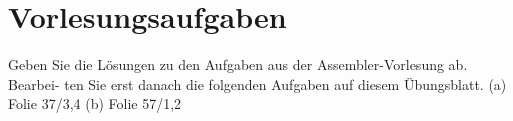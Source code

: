 \documentclass{lehramt-informatik-aufgabe}
\begin{document}
\section{Vorlesungsaufgaben}

Geben Sie die Lösungen zu den Aufgaben aus der Assembler-Vorlesung ab. Bearbei-
ten Sie erst danach die folgenden Aufgaben auf diesem Übungsblatt.
(a) Folie 37/3,4
(b) Folie 57/1,2
\end{document}
